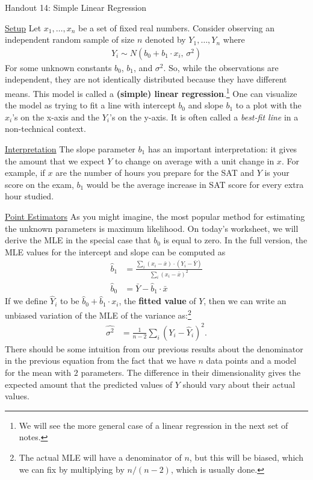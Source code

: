 \documentclass{tufte-handout}
\begin{document}
\justify

{\LARGE Handout 14: Simple Linear Regression}

\vspace*{18pt}

\noindent
\underline{Setup}
Let $x_1, \ldots, x_n$ be a set of fixed real numbers.
Consider observing an independent random sample of size $n$ denoted
by $Y_1, \ldots, Y_n$ where
\begin{align*}
Y_i \sim N(b_0 + b_1 \cdot x_i, \, \sigma^2)
\end{align*}
For some unknown constants $b_0$, $b_1$, and $\sigma^2$. So, while
the observations are independent, they are not identically distributed
because they have different means.
This model is called a \textbf{(simple) linear regression}.\footnote{
  We will see the more general case of a linear regression in the next
  set of notes.
}
One can visualize the model as trying to fit a line with intercept $b_0$
and slope $b_1$ to a plot with the $x_i$'s on the x-axis and the $Y_i$'s on
the y-axis. It is often called a \textit{best-fit line} in a non-technical
context.

\vspace*{12pt}

\noindent
\underline{Interpretation}
The slope parameter $b_1$ has an important interpretation: it gives
the amount that we expect $Y$ to change on average with a unit change
in $x$. For example, if $x$ are the number of hours you prepare for the
SAT and $Y$ is your score on the exam, $b_1$ would be the average
increase in SAT score for every extra hour studied.

\vspace*{12pt}

\noindent
\underline{Point Estimators}
As you might imagine, the most popular method for estimating the 
unknown parameters is maximum likelihood. On today's worksheet, we
will derive the MLE in the special case that $b_0$ is equal to zero.
In the full version, the MLE values for the intercept and slope can
be computed as
\begin{align*}
\widehat{b}_1 &= \frac{\sum_i (x_i - \bar{x}) \cdot (Y_i - \bar{Y})}{\sum_i (x_i - \bar{x})^2} \\
\widehat{b}_0 &= \bar{Y} -  \widehat{b}_1 \cdot \bar{x}
\end{align*}
If we define $\widehat{Y}_i$ to be $\widehat{b}_0 + \widehat{b}_1 \cdot x_i$,
the \textbf{fitted value} of $Y$, then we can write an unbiased 
variation of the MLE of the variance as:\footnote{
  The actual MLE will have a denominator of $n$, but this will be
  biased, which we can fix by multiplying by $n/(n-2)$, which is
  usually done.
}
\begin{align*}
\widehat{\sigma^2} &= \frac{1}{n-2} \sum_i (Y_i - \widehat{Y}_i)^2.
\end{align*}
There should be some intuition from our previous results about the
denominator in the previous equation from the fact that we have
$n$ data points and a model for the mean with $2$ parameters. The
difference in their dimensionality gives the expected amount that the
predicted values of $Y$ should vary about their actual values.
\end{document}
